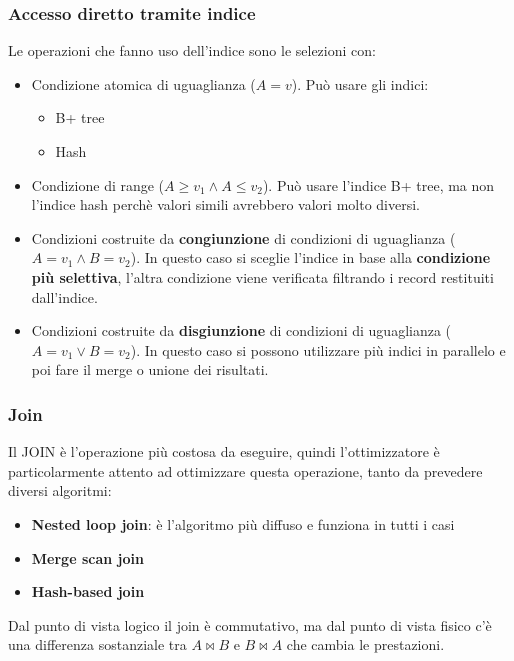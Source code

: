 \documentclass[a4paper,twoside]{article}
\begin{document}
\subsubsection{Accesso diretto tramite indice}
Le operazioni che fanno uso dell'indice sono le selezioni con:
\begin{itemize}
  \item Condizione atomica di uguaglianza (\( A = v \)). Può usare gli indici:
    \begin{itemize}
      \item B+ tree
      \item Hash
    \end{itemize}

  \item Condizione di range (\( A \ge v_1 \land A \le v_2 \)). Può usare l'indice
    B+ tree, ma non l'indice hash perchè valori simili avrebbero valori molto diversi.

  \item Condizioni costruite da \textbf{congiunzione} di condizioni di uguaglianza
    (\( A = v_1 \land B = v_2 \)). In questo caso si sceglie l'indice in base alla
    \textbf{condizione più selettiva}, l'altra condizione viene verificata
    filtrando i record restituiti dall'indice.

  \item Condizioni costruite da \textbf{disgiunzione} di condizioni di uguaglianza
    (\( A = v_1 \lor B = v_2 \)). In questo caso si possono utilizzare più
    indici in parallelo e poi fare il merge o unione dei risultati.
\end{itemize}

\subsubsection{Join}
Il JOIN è l'operazione più costosa da eseguire, quindi l'ottimizzatore è particolarmente
attento ad ottimizzare questa operazione, tanto da prevedere diversi algoritmi:
\begin{itemize}
  \item \textbf{Nested loop join}: è l'algoritmo più diffuso e funziona in tutti i casi
  \item \textbf{Merge scan join}
  \item \textbf{Hash-based join}
\end{itemize}
Dal punto di vista logico il join è commutativo, ma dal punto di vista fisico c'è
una differenza sostanziale tra \( A \bowtie B \) e \( B \bowtie A \) che cambia
le prestazioni.
\end{document}

